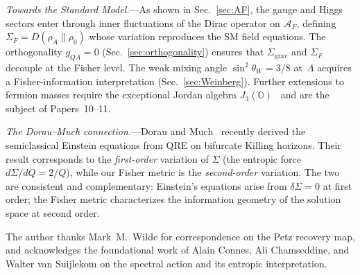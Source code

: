 \documentclass[prl,twocolumn,superscriptaddress,longbibliography]{revtex4-2}
\begin{document}
\emph{Towards the Standard Model.}---As shown in
Sec.~\ref{sec:AF}, the gauge and Higgs sectors
enter through inner fluctuations of the Dirac
operator on $\mathcal{A}_F$, defining
$\Sigma_F = D(\rho_A \| \rho_0)$ whose variation
reproduces the SM field equations.
The orthogonality
$g_{QA} = 0$ (Sec.~\ref{sec:orthogonality})
ensures that $\Sigma_{\mathrm{grav}}$ and
$\Sigma_F$ decouple at the Fisher level.
The weak mixing angle $\sin^2\theta_W = 3/8$
at~$\Lambda$ acquires a Fisher-information
interpretation (Sec.~\ref{sec:Weinberg}).
Further extensions to fermion masses require
the exceptional Jordan algebra
$J_3(\mathbb{O})$~\cite{Singh2025,FureyHughes2024}
and are the subject of Papers~10--11.

\emph{The Dorau--Much connection.}---Dorau and
Much~\cite{DorauMuch2025} recently derived the
semiclassical Einstein equations from QRE on
bifurcate Killing horizons.
Their result corresponds to the \emph{first-order}
variation of $\Sigma$ (the entropic force
$d\Sigma/dQ = 2/Q$), while our Fisher metric
is the \emph{second-order} variation.
The two are consistent and complementary:
Einstein's equations arise from $\delta\Sigma = 0$
at first order; the Fisher metric characterizes
the information geometry of the solution space
at second order.


\begin{acknowledgments}
The author thanks Mark~M.~Wilde for correspondence
on the Petz recovery map, and acknowledges the
foundational work of Alain Connes, Ali Chamseddine,
and Walter van Suijlekom on the spectral action
and its entropic interpretation.
\end{acknowledgments}
\end{document}
